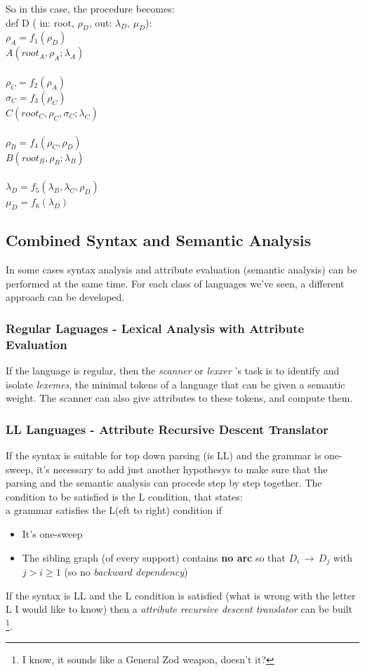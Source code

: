 				So in this case, the procedure becomes:\\
				def D ( in: root, $\rho_D$, out: $\lambda_D$, $\mu_D$):\\
			    $\rho_A = f_1(\rho_D)$\\
			    $A(root_A, \rho_A; \lambda_A)$\\\\
				$\rho_C = f_2(\rho_A)$\\
				$\sigma_C = f_3(\rho_C)$\\
				$C(root_C, \rho_C, \sigma_C; \lambda_C)$\\\\
				$\rho_B = f_4(\rho_C, \rho_D)$\\
				$B(root_B, \rho_B; \lambda_B)$\\\\
				$\lambda_D = f_5(\lambda_B, \lambda_C, \rho_D)$\\
				$\mu_D = f_6(\lambda_D)$\\
	
	\subsection{Combined Syntax and Semantic Analysis}
		In some cases syntax analysis and attribute evaluation (semantic analysis) can be performed at the same time. For each class of languages we've seen, a different approach can be developed.
		
		\subsubsection{Regular Laguages - Lexical Analysis with Attribute Evaluation}
			If the language is regular, then the \emph{scanner} or \emph{lexxer} 's task is to identify and isolate \emph{lexemes}, the minimal tokens of a language that can be given a semantic weight. The scanner can also give attributes to these tokens, and compute them.
		
		\subsubsection{LL Languages - Attribute Recursive Descent Translator}
			If the syntax is suitable for top down parsing (is LL) and the grammar is one-sweep, it's necessary to add just another hypothesys to make sure that the parsing and the semantic analysis can procede step by step together. The condition to be satisfied is the L condition, that states:\\
			a grammar satisfies the L(eft to right) condition if
			\begin{itemize}
				\item It's one-sweep
				\item The sibling graph (of every support) contains \textbf{no arc} so that $D_i \,\rightarrow\, D_j$ with $j > i \geq 1$ (so no \emph{backward dependency})
			\end{itemize}
			If the syntax is LL and the L condition is satisfied (what is wrong with the letter L I would like to know) then a \emph{attribute recursive descent translator} can be built \footnote{I know, it sounds like a General Zod weapon, doesn't it?}.\\

